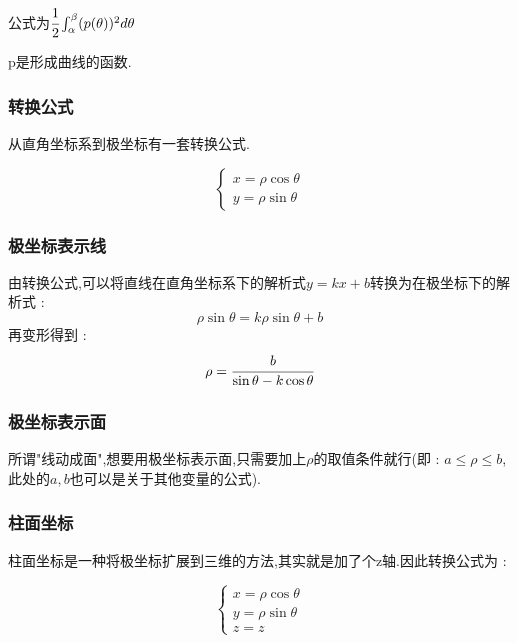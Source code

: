 \documentclass[UTF8,12pt]{ctexbook}
\newcommand{\definiteIntegral}[2]{\int^{#1}_{#2}}
\begin{document}
{{{{  公式为$\cfrac{1}{2}\definiteIntegral{\beta}{\alpha}(p(\theta))^2d\theta$

  p是形成曲线的函数.
  }%

  \subsubsection{转换公式}{
    从直角坐标系到极坐标有一套转换公式.

    $$
      \begin{cases}
        x = \rho\cos\theta \\
        y = \rho\sin\theta
      \end{cases}
    $$
  }%

  \subsubsection{极坐标表示线}{
    \begin{center}
    \end{center}

    由转换公式,可以将直线在直角坐标系下的解析式$y = kx + b$转换为在极坐标下的解析式 :
    $$
      \rho\sin\theta = k\rho\sin\theta + b
    $$
    再变形得到 :
    $$
      \rho = \cfrac{b}{\sin\theta - k\cos\theta}
    $$
  }%

  \subsubsection{极坐标表示面}{
    所谓"线动成面",想要用极坐标表示面,只需要加上$\rho$的取值条件就行(即 : $a \leq \rho \leq b$,此处的$a,b$也可以是关于其他变量的公式).
  }%

  \subsubsection{柱面坐标}{
    柱面坐标是一种将极坐标扩展到三维的方法,其实就是加了个z轴.因此转换公式为 :

    $$
      \begin{cases}
        x = \rho\cos\theta \\
        y = \rho\sin\theta \\
        z = z
      \end{cases}
    $$
  }%

}}}
\end{document}
